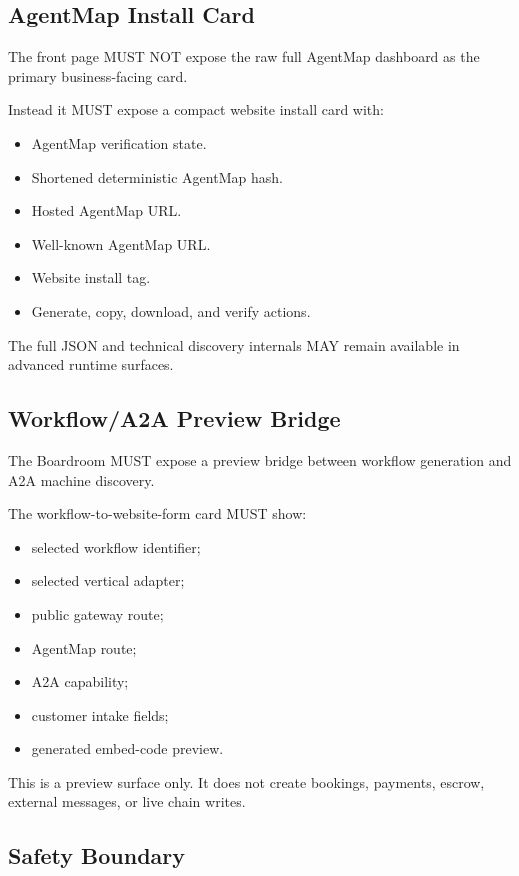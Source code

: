 \subsection{AgentMap Install Card}

The front page MUST NOT expose the raw full AgentMap dashboard as the primary
business-facing card.

Instead it MUST expose a compact website install card with:

\begin{itemize}
  \item AgentMap verification state.
  \item Shortened deterministic AgentMap hash.
  \item Hosted AgentMap URL.
  \item Well-known AgentMap URL.
  \item Website install tag.
  \item Generate, copy, download, and verify actions.
\end{itemize}

The full JSON and technical discovery internals MAY remain available in advanced
runtime surfaces.

\subsection{Workflow/A2A Preview Bridge}

The Boardroom MUST expose a preview bridge between workflow generation and A2A
machine discovery.

The workflow-to-website-form card MUST show:

\begin{itemize}
  \item selected workflow identifier;
  \item selected vertical adapter;
  \item public gateway route;
  \item AgentMap route;
  \item A2A capability;
  \item customer intake fields;
  \item generated embed-code preview.
\end{itemize}

This is a preview surface only. It does not create bookings, payments, escrow,
external messages, or live chain writes.

\subsection{Safety Boundary}

